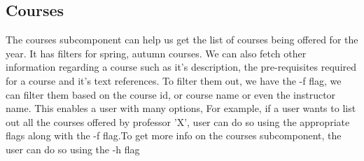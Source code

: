 \documentclass[12pt, a4paper]{article}
\begin{document}
\subsection{Courses}
The courses subcomponent can help us get the list of courses being offered for the year. It has filters for spring, autumn courses.
We can also fetch other information regarding a course such as it's description, the pre-requisites required for a course and it's text references.
To filter them out, we have the -f flag, we can filter them based on the course id, or course name or even the instructor name. This enables a user
with many options, For example, if a user wants to list out all the courses offered by professor 'X', user can do so using the appropriate flags
along with the -f flag.To get more info on the courses subcomponent, the user can do so using the -h flag\\
\end{document}
